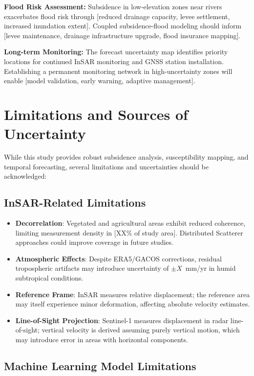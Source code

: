 \textbf{Flood Risk Assessment:} Subsidence in low-elevation zones near rivers exacerbates flood risk through [reduced drainage capacity, levee settlement, increased inundation extent]. Coupled subsidence-flood modeling should inform [levee maintenance, drainage infrastructure upgrade, flood insurance mapping].

\textbf{Long-term Monitoring:} The forecast uncertainty map identifies priority locations for continued InSAR monitoring and GNSS station installation. Establishing a permanent monitoring network in high-uncertainty zones will enable [model validation, early warning, adaptive management].


\section{Limitations and Sources of Uncertainty}

While this study provides robust subsidence analysis, susceptibility mapping, and temporal forecasting, several limitations and uncertainties should be acknowledged:

\subsection{InSAR-Related Limitations}

\begin{itemize}
\item \textbf{Decorrelation}: Vegetated and agricultural areas exhibit reduced coherence, limiting measurement density in [XX\% of study area]. Distributed Scatterer approaches could improve coverage in future studies.
\item \textbf{Atmospheric Effects}: Despite ERA5/GACOS corrections, residual tropospheric artifacts may introduce uncertainty of $\pm X$~mm/yr in humid subtropical conditions.
\item \textbf{Reference Frame}: InSAR measures relative displacement; the reference area may itself experience minor deformation, affecting absolute velocity estimates.
\item \textbf{Line-of-Sight Projection}: Sentinel-1 measures displacement in radar line-of-sight; vertical velocity is derived assuming purely vertical motion, which may introduce error in areas with horizontal components.
\end{itemize}

\subsection{Machine Learning Model Limitations}


